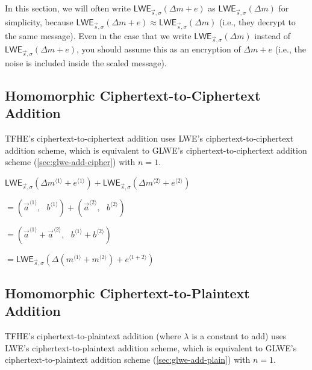 In this section, we will often write $\textsf{LWE}_{\vec{s},\sigma}(\Delta  m + e)$ as $\textsf{LWE}_{\vec{s},\sigma}(\Delta  m)$ for simplicity, because $\textsf{LWE}_{\vec{s},\sigma}(\Delta  m + e) \approx \textsf{LWE}_{\vec{s},\sigma}(\Delta  m)$ (i.e., they decrypt to the same message). Even in the case that we write $\textsf{LWE}_{\vec{s},\sigma}(\Delta  m)$ instead of $\textsf{LWE}_{\vec{s},\sigma}(\Delta  m + e)$, you should assume this as an encryption of $\Delta m + e$ (i.e., the noise is included inside the scaled message).

\subsection{Homomorphic Ciphertext-to-Ciphertext Addition}
\label{subsec:tfhe-add-cipher}

TFHE's ciphertext-to-ciphertext addition uses LWE's ciphertext-to-ciphertext addition scheme, which is equivalent to GLWE's ciphertext-to-ciphertext addition scheme (\autoref{sec:glwe-add-cipher}) with $n = 1$.  


\begin{tcolorbox}[title={\textbf{\tboxlabel{\ref*{subsec:tfhe-add-cipher}} TFHE Ciphertext-to-Ciphertext Addition}}]
$\textsf{LWE}_{\vec{s}, \sigma}(\Delta m^{\langle 1 \rangle} + e^{\langle 1 \rangle} ) + \textsf{LWE}_{\vec{s}, \sigma}(\Delta m^{\langle 2 \rangle} + e^{\langle 2 \rangle}) $

$ = ( \vec{a}^{\langle 1 \rangle}, \text{ } b^{\langle 1 \rangle}) + (\vec{a}^{\langle 2 \rangle}, \text{ } b^{\langle 2 \rangle}) $

$ = ( \vec{a}^{\langle 1 \rangle} + \vec{a}^{\langle 2 \rangle}, \text{ } b^{\langle 1 \rangle} + b^{\langle 2 \rangle} ) $

$= \textsf{LWE}_{\vec{s}, \sigma}(\Delta(m^{\langle 1 \rangle} + m^{\langle 2 \rangle}) + e^{\langle 1 + 2 \rangle} )$
\label{Here}
\end{tcolorbox}


\subsection{Homomorphic Ciphertext-to-Plaintext Addition}
\label{subsec:tfhe-add-plain}

TFHE's ciphertext-to-plaintext addition (where $\lambda$ is a constant to add) uses LWE's ciphertext-to-plaintext addition scheme, which is equivalent to GLWE's ciphertext-to-plaintext addition scheme (\autoref{sec:glwe-add-plain}) with $n = 1$.  


